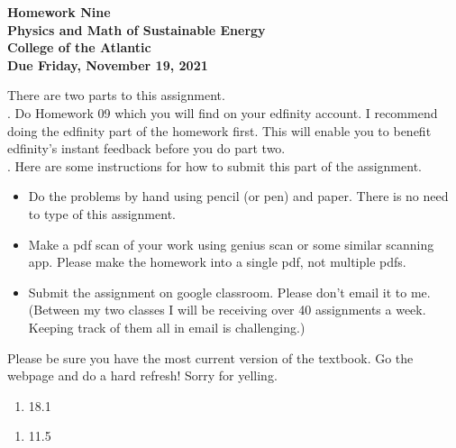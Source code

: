 \documentclass[12pt]{article}
\begin{document}
\pagestyle{empty}
 
\begin{center}
{\LARGE {\bf Homework Nine}}\\
\bigskip
{\Large {\bf Physics and Math of Sustainable Energy}}\\
\bigskip
{\Large {\bf College of the Atlantic}}\\
\bigskip
{ {\bf Due Friday, November 19, 2021}}\\ 
\end{center}
\smallskip


\noindent There are two parts to this assignment.\\

.  Do Homework 09 which you will find
on your edfinity account.  I recommend doing the edfinity part of the
homework first.  This will enable you to benefit edfinity's instant
feedback before you do part two.\\


.  Here are some
instructions for how to submit this part of the assignment.
\begin{itemize}
\item Do the problems by hand using pencil (or pen) and paper.
  There is no need to type of this assignment.
\item Make a pdf scan of your work using genius scan or some
  similar scanning app.  Please make the homework into a single
  pdf, not multiple pdfs.
\item Submit the assignment on google classroom.  Please don't
  email it to me.  (Between my two classes I will be receiving
  over 40 assignments a week.  Keeping track of them all in email
  is challenging.)
\end{itemize}


  Please be sure you have the most
current version of the textbook.  Go the webpage and do a hard
refresh!  Sorry for yelling.\\ 

\begin{enumerate}
\setlength{\itemsep}{-1mm}
\item 18.1
\end{enumerate}

\begin{enumerate}
\setlength{\itemsep}{-1mm}
\item 11.5
\end{enumerate}
\end{document}

